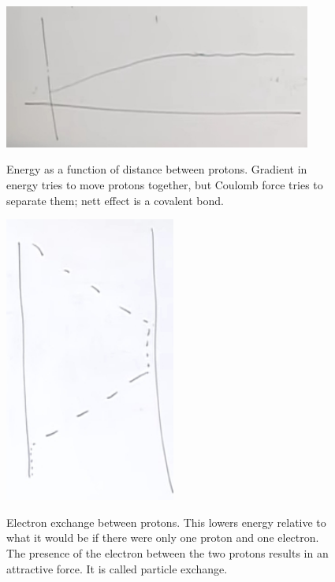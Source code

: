 \documentclass[]{article}
\begin{document}
\begin{figure}[H]
	\caption{Energy as a function of distance between protons. Gradient in energy tries to move protons together, but Coulomb force tries to separate them; nett effect is a covalent bond.}
	\includegraphics[width=0.9\textwidth]{2proton1ElectronEnergy}\label{fig:2proton1ElectronEnergy}
\end{figure}

\begin{figure}[H]
	\begin{center}
		\caption{Electron exchange between protons. This lowers energy relative to what it would be if there were only one proton and one electron. The presence of the electron between the two protons results in an attractive force. It is called particle exchange.}
		\includegraphics[width=0.5\textwidth]{2proton1ElectronHopping}\label{fig:2proton1ElectronHopping}
	\end{center}
\end{figure}
\end{document}
